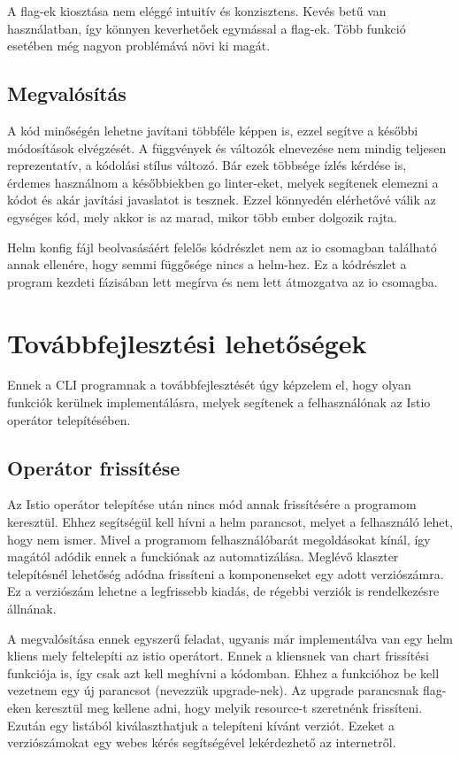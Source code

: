 A flag-ek kiosztása nem eléggé intuitív és konzisztens. Kevés betű van használatban, így könnyen keverhetőek egymással a flag-ek.
Több funkció esetében még nagyon problémává növi ki magát.

\subsection*{Megvalósítás}
A kód minőségén lehetne javítani többféle képpen is, ezzel segítve a későbbi módosítások elvégzését.
A függvények és változók elnevezése nem mindig teljesen reprezentatív, a kódolási stílus változó.
Bár ezek többsége ízlés kérdése is, érdemes használnom a későbbiekben go linter-eket, melyek segítenek elemezni a kódot és akár javítási javaslatot is tesznek. Ezzel könnyedén elérhetővé válik az egységes kód, mely akkor is az marad, mikor több ember dolgozik rajta. 

Helm konfig fájl beolvasásáért felelős kódrészlet nem az io csomagban található annak ellenére, hogy semmi függősége nincs a helm-hez.
Ez a kódrészlet a program kezdeti fázisában lett megírva és nem lett átmozgatva az io csomagba.

\section{Továbbfejlesztési lehetőségek}
Ennek a CLI programnak a továbbfejlesztését úgy képzelem el, hogy olyan funkciók kerülnek implementálásra, melyek segítenek a felhasználónak az Istio operátor telepítésében.

\subsection{Operátor frissítése}
Az Istio operátor telepítése után nincs mód annak frissítésére a programom keresztül.
Ehhez segítségül kell hívni a helm parancsot, melyet a felhasználó lehet, hogy nem ismer.
Mivel a programom felhasználóbarát megoldásokat kínál, így magától adódik ennek a funckiónak az automatizálása.
Meglévő klaszter telepítésnél lehetőség adódna frissíteni a komponenseket egy adott verziószámra.
Ez a verziószám lehetne a legfrissebb kiadás, de régebbi verziók is rendelkezésre állnának.

A megvalósítása ennek egyszerű feladat, ugyanis már implementálva van egy helm kliens mely feltelepíti az istio operátort.
Ennek a kliensnek van chart frissítési funkciója is, így csak azt kell meghívni a kódomban.
Ehhez a funkcióhoz be kell vezetnem egy új parancsot (nevezzük upgrade-nek).
Az upgrade parancsnak flag-eken keresztül meg kellene adni, hogy melyik resource-t szeretnénk frissíteni.
Ezután egy listából kiválaszthatjuk a telepíteni kívánt verziót. Ezeket a verziószámokat egy webes kérés segítségével lekérdezhető az internetről.

